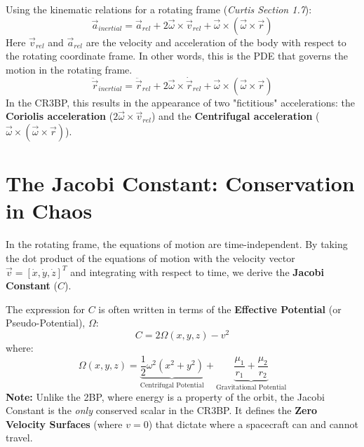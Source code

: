 \documentclass[11pt, letter]{article}
\begin{document}
Using the kinematic relations for a rotating frame (\textit{Curtis Section 1.7}):
\begin{equation}
  \vec{a}_{inertial} = \vec{a}_{rel} + 2\vec{\omega} \times \vec{v}_{rel} + \vec{\omega} \times (\vec{\omega} \times \vec{r})
\end{equation}
Here $\vec{v}_{rel}$ and $\vec{a}_{rel}$ are the velocity and acceleration of the body with respect to the rotating coordinate frame. In other words, this is the PDE that governs the motion in the rotating frame.
\begin{equation}
  \ddot{\vec{r}}_{inertial} = \ddot{\vec{r}}_{rel} + 2\vec{\omega} \times \dot{\vec{r}}_{rel} + \vec{\omega} \times (\vec{\omega} \times \vec{r})
\end{equation}
In the CR3BP, this results in the appearance of two "fictitious" accelerations: the \textbf{Coriolis acceleration} ($2\vec{\omega} \times \vec{v}_{rel}$) and the \textbf{Centrifugal acceleration} ($\vec{\omega} \times (\vec{\omega} \times \vec{r})$).

\section{The Jacobi Constant: Conservation in Chaos}
In the rotating frame, the equations of motion are time-independent. By taking the dot product of the equations of motion with the velocity vector $\vec{v} = [\dot{x}, \dot{y}, \dot{z}]^T$ and integrating with respect to time, we derive the \textbf{Jacobi Constant} ($C$).

The expression for $C$ is often written in terms of the \textbf{Effective Potential} (or Pseudo-Potential), $\Omega$:
\begin{equation}
  C = 2\Omega(x, y, z) - v^2
\end{equation}
where:
\begin{equation}
  \Omega(x, y, z) = \underbrace{\frac{1}{2}\omega^2(x^2 + y^2)}_{\text{Centrifugal Potential}} + \underbrace{\frac{\mu_1}{r_1} + \frac{\mu_2}{r_2}}_{\text{Gravitational Potential}}
\end{equation}
\textbf{Note:} Unlike the 2BP, where energy is a property of the orbit, the Jacobi Constant is the \textit{only} conserved scalar in the CR3BP. It defines the \textbf{Zero Velocity Surfaces} (where $v=0$) that dictate where a spacecraft can and cannot travel.
\end{document}
